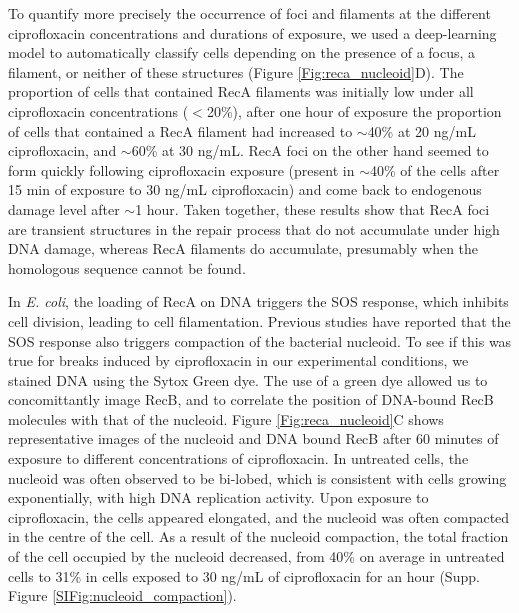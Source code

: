 To quantify more precisely the occurrence of foci and filaments at the different ciprofloxacin concentrations and durations of exposure, we used a deep-learning model to automatically classify cells depending on the presence of a focus, a filament, or neither of these structures (Figure \ref{Fig:reca_nucleoid}D). The proportion of cells that contained RecA filaments was initially low under all ciprofloxacin concentrations ($<$20\%), after one hour of exposure the proportion of cells that contained a RecA filament had increased to $\sim$40\% at 20 ng/mL ciprofloxacin, and $\sim$60\% at 30 ng/mL. RecA foci on the other hand seemed to form quickly following ciprofloxacin exposure (present in $\sim$40\% of the cells after 15 min of exposure to 30 ng/mL ciprofloxacin) and come back to endogenous damage level after $\sim$1 hour. Taken together, these results show that RecA foci are transient structures in the repair process that do not accumulate under high DNA damage, whereas RecA filaments do accumulate, presumably when the homologous sequence cannot be found.

In \emph{E. coli}, the loading of RecA on DNA triggers the SOS response, which inhibits cell division, leading to cell filamentation. Previous studies have reported that the SOS response also triggers compaction of the bacterial nucleoid.\cite{Odsbu2014} To see if this was true for breaks induced by ciprofloxacin in our experimental conditions, we stained DNA using the Sytox Green dye. The use of a green dye allowed us to concomittantly image RecB, and to correlate the position of DNA-bound RecB molecules with that of the nucleoid. Figure \ref{Fig:reca_nucleoid}C shows representative images of the nucleoid and DNA bound RecB after 60 minutes of exposure to different concentrations of ciprofloxacin. In untreated cells, the nucleoid was often observed to be bi-lobed, which is consistent with cells growing exponentially, with high DNA replication activity. Upon exposure to ciprofloxacin, the cells appeared elongated, and the nucleoid was often compacted in the centre of the cell. As a result of the nucleoid compaction, the total fraction of the cell occupied by the nucleoid decreased, from 40\% on average in untreated cells to 31\% in cells exposed to 30 ng/mL of ciprofloxacin for an hour (Supp. Figure \ref{SIFig:nucleoid_compaction}).

